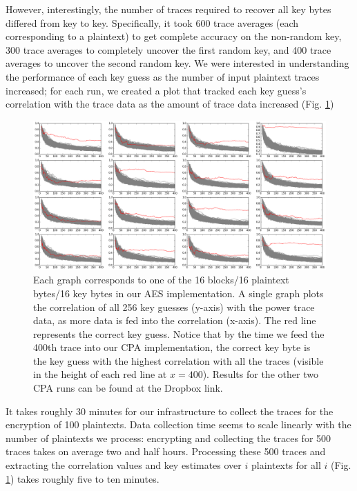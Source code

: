 \documentclass[journal]{ieee_style}
\begin{document}
However, interestingly, the number of traces required to recover all key bytes differed from key to key. Specifically, it took 600 trace averages (each corresponding to a plaintext) to get complete accuracy on the non-random key, 300 trace averages to completely uncover the first random key, and 400 trace averages to uncover the second random key. We were interested in understanding the performance of each key guess as the number of input plaintext traces increased; for each run, we created a plot that tracked each key guess's correlation with the trace data as the amount of trace data increased (Fig. \ref{results_random2})

\begin{figure}[]
\centering
\includegraphics[width=7in]{12-04-15-19-46-23-newrandomkey2-corr-evolution}
\caption{Each graph corresponds to one of the 16 blocks/16 plaintext bytes/16 key bytes in our AES implementation. A single graph plots the correlation of all 256 key guesses (y-axis) with the power trace data, as more data is fed into the correlation (x-axis). The red line represents the correct key guess. Notice that by the time we feed the 400th trace into our CPA implementation, the correct key byte is the key guess with the highest correlation with all the traces (visible in the height of each red line at $x=400$). Results for the other two CPA runs can be found at the Dropbox link.}
\label{results_random2}
\end{figure}

It takes roughly 30 minutes for our infrastructure to collect the traces for the encryption of 100 plaintexts. Data collection time seems to scale linearly with the number of plaintexts we process: encrypting and collecting the traces for 500 traces takes on average two and half hours. Processing these 500 traces and extracting the correlation values and key estimates over $i$ plaintexts for all $i$ (Fig. \ref{results_random2}) takes roughly five to ten minutes.
\end{document}
